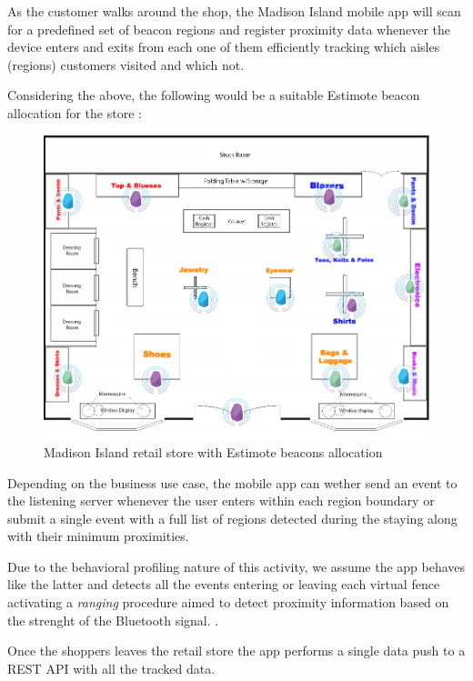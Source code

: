 As the customer walks around the shop, the Madison Island mobile app will scan for a predefined set of beacon regions and register proximity data whenever the device enters and exits from each one of them efficiently tracking which aisles (regions) customers visited and which not. 

Considering the above, the following would be a suitable Estimote beacon allocation for the store :

\vspace{0.5cm}
\begin{figure}[H]
  \centering
    \includegraphics[width=16cm]{images/madison/retail-map-beacon.jpg}
  \caption{Madison Island retail store with Estimote beacons allocation}
  \label{fig:beacons-map}
\end{figure}
\vspace{0.5cm}

Depending on the business use case, the mobile app can wether send an event to the listening server whenever the user enters within each region boundary or submit a single event with a full list of regions detected during the staying along with their minimum proximities. 

Due to the behavioral profiling nature of this activity, we assume the app behaves like the latter and detects all the events entering or leaving each virtual fence activating a \textit{ranging} procedure aimed to detect proximity information based on the strenght of the Bluetooth signal. \cite{region-monitoring-apple}.

Once the shoppers leaves the retail store the app performs a single data push to a REST API with all the tracked data.

